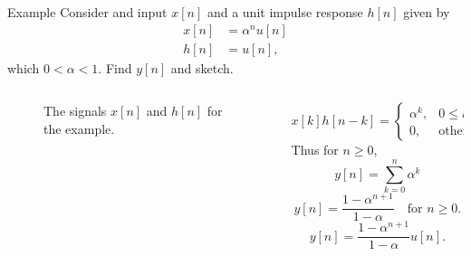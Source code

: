 \begin{frame}{Example}
    Consider and input $x[n]$ and a unit impulse response $h[n]$ given by
    \begin{equation}
        \begin{split}
            x[n] &= \alpha^nu[n]\\
            h[n] &= u[n],
        \end{split}
    \end{equation}
    which $0 < \alpha < 1$. Find $y[n]$ and sketch.
\end{frame}

\begin{frame}[plain]
    \begin{columns}
        \begin{column}{0.6\textwidth}
            {
            \begin{figure}
              \centering
              
              \caption{The signals $x[n]$ and $h[n]$ for the example.}\label{fi:dt_conv_example23}
            \end{figure}
            }
        \end{column}
        \begin{column}{0.4\textwidth}
            \begin{equation*}
                x[k]h[n-k] = \begin{cases}\alpha^k, & 0 \leq k \leq n,\\ 0, &\text{otherwise}.\end{cases}
            \end{equation*}
            \pause
            Thus for $n \geq 0$,
            \begin{equation*}
                y[n] = \sum_{k=0}^{n}\alpha^k
            \end{equation*}
            \begin{equation*}
                y[n] = \frac{1-\alpha^{n+1}}{1-\alpha}\quad \text{for } n \geq 0.
            \end{equation*}
            \begin{equation*}
                y[n] = \frac{1-\alpha^{n+1}}{1-\alpha}u[n].
            \end{equation*}
        \end{column}
    \end{columns}

\end{frame}

